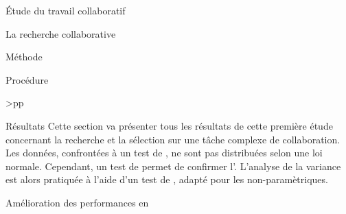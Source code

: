 \documentclass[myfrancais]{mythesis}
\begin{document}
\begin{mypart}{Étude du travail collaboratif}
\begin{mychapter}{La recherche collaborative}
\begin{mysection}{Méthode}
\begin{mysubsection}{Procédure}
\begin{mytable}
\begin{mytabular}{>{\bfseries}p{\exponefirstcolumn}p{\exponesecondcolumn}}
							\mymiddlerule[\heavyrulewidth]
							 \\
							\mybottomrule
						\end{mytabular}
					\end{mytable}
				\end{mysubsection}
			\end{mysection}
			\begin{mysection}{Résultats}
				Cette section va présenter tous les résultats de cette première étude concernant la recherche et la sélection sur une tâche complexe de collaboration.
				Les données, confrontées à un test de , ne sont pas distribuées selon une loi normale.
				Cependant, un test de  permet de confirmer l'.
				L'analyse de la variance est alors pratiquée à l'aide d'un test de , adapté pour les  non-paramètriques.
				\begin{mysubsection}{Amélioration des performances en }

\end{mysubsection}
\end{mysection}
\end{mychapter}
\end{mypart}
\end{document}
